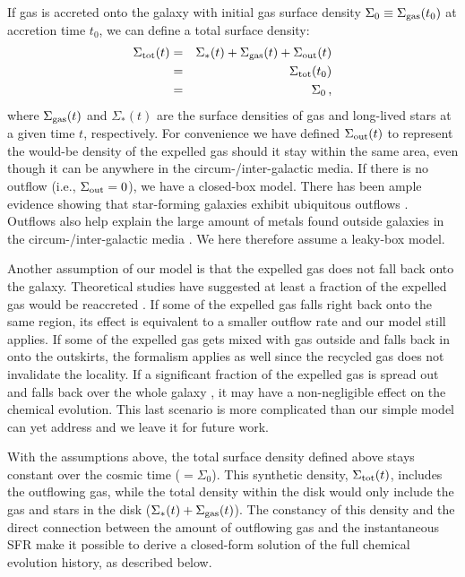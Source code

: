 \documentclass[12pt, appendixfloats, numberedappendix]{emulateapj}
\begin{document}
If gas is accreted onto the galaxy with initial gas surface density $\Sigma_0 \equiv \Sigma_{\rm gas}(t_0)$ at accretion time $t_0$, 
we can define a total surface density:
\begin{eqnarray}
\Sigma_{\rm tot}(t) & = & \Sigma_*(t) + \Sigma_{\rm gas}(t) + \Sigma_{\rm out}(t) \nonumber \\
          & = & \Sigma_{\rm tot} (t_0) \nonumber \\
          & = & \Sigma_0\,\mathrm{,}
\label{eq:sigma0}
\end{eqnarray}
\noindent where $\Sigma_{\rm gas}(t)$ and $\Sigma_*(t)$ are the surface densities of gas and long-lived stars at a given time $t$, respectively.
For convenience we have defined $\Sigma_{\rm out} (t)$ to represent the would-be density of the expelled gas 
should it stay within the same area, even though it can be anywhere in the circum-/inter-galactic media. 
If there is no outflow (i.e., $\Sigma_{\rm out} = 0$), we have a closed-box model. 
There has been ample evidence showing that star-forming galaxies exhibit 
ubiquitous outflows \citep[\eg][among others]{lynds63a, bland88a, heckman90a, shapley03a, rupke05a, martin09a, weiner09a, rubin14a, zhu15a}.
Outflows also help explain the large amount of metals found outside galaxies in the circum-/inter-galactic 
media \citep[\eg][among others]{bergeron86a, steidel10a, tumlinson11a, stocke13a, borthakur13a, werk14a, bordoloi14a, zhu14a}. We here therefore assume a leaky-box model.

Another assumption of our model is that the expelled gas does not fall back onto the galaxy.
Theoretical studies have suggested at least a fraction of the expelled gas would be 
reaccreted \citep[\eg][]{oppenheimer10a, bower12a, marasco12a, brook12a, henriques13a, christensen16a}.
If some of the expelled gas falls right back onto the same region, its effect is equivalent to a smaller outflow rate and our model still applies.
If some of the expelled gas gets mixed with gas outside and falls back in onto the outskirts, the formalism applies as well since the recycled gas does not invalidate the locality.
If a significant fraction of the expelled gas is spread out and falls back over the whole galaxy \citep[e.g., as in the galaxy fountain model,][]{marasco12a}, it may have a non-negligible effect 
on the chemical evolution. This last scenario is more complicated than our simple model can yet address and we leave it for future work.

With the assumptions above, the total surface density defined above stays constant over the cosmic 
time ($=\Sigma_0$). This synthetic density, $\Sigma_{\rm tot}(t)$, includes the outflowing gas, 
while the total density within the disk would only include the gas and stars in the disk ($\Sigma_*(t) + \Sigma_{\rm gas}(t)$). 
The constancy of this density and the direct connection between the amount of outflowing gas and the instantaneous SFR
make it possible to derive a closed-form solution of the full chemical evolution history, as described below.
\end{document}
